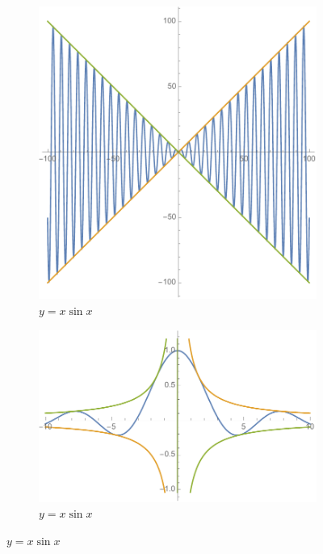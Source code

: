 \begin{figure}[h]
	\centering
	\begin{subfigure}[t]{0.45\textwidth}
		\centering
		\includegraphics[width=\textwidth]{./images/Ch01/xsinx.pdf}
		\caption{$y=x\sin x$}
	\end{subfigure}
	\begin{subfigure}[t]{0.45\textwidth}
		\centering
		\includegraphics[width=\textwidth]{./images/Ch01/1xsinx.pdf}
		\caption{$y=x\sin x$}
	\end{subfigure}


\end{figure}
